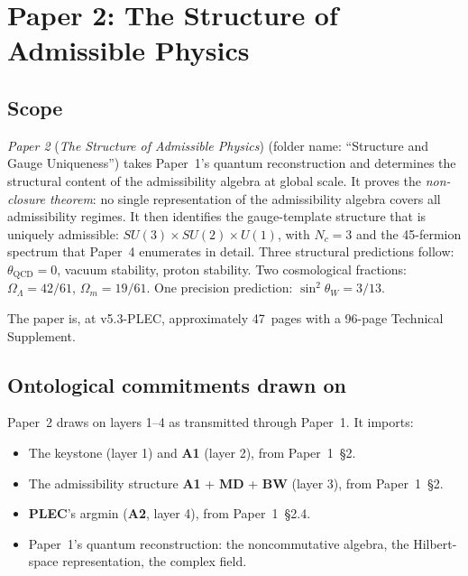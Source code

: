 \documentclass[11pt]{article}
\newcommand{\paperref}[2]{\emph{Paper #1} (\emph{#2})}
\newcommand{\Aone}{\textbf{A1}}
\newcommand{\PLEC}{\textbf{PLEC}}
\begin{document}
\section{Paper 2: The Structure of Admissible Physics}\label{sec:P2}

\subsection{Scope}\label{sec:P2_scope}

\paperref{2}{The Structure of Admissible Physics} (folder name: ``Structure and Gauge Uniqueness'') takes Paper~1's quantum reconstruction and determines the structural content of the admissibility algebra at global scale. It proves the \emph{non-closure theorem}: no single representation of the admissibility algebra covers all admissibility regimes. It then identifies the gauge-template structure that is uniquely admissible: $SU(3) \times SU(2) \times U(1)$, with $N_c = 3$ and the 45-fermion spectrum that Paper~4 enumerates in detail. Three structural predictions follow: $\theta_{\mathrm{QCD}} = 0$, vacuum stability, proton stability. Two cosmological fractions: $\Omega_\Lambda = 42/61$, $\Omega_m = 19/61$. One precision prediction: $\sin^2\theta_W = 3/13$.

The paper is, at v5.3-PLEC, approximately 47~pages with a 96-page Technical Supplement.

\subsection{Ontological commitments drawn on}\label{sec:P2_commitments}

Paper~2 draws on layers 1--4 as transmitted through Paper~1. It imports:

\begin{itemize}
    \item The keystone (layer 1) and \Aone{} (layer 2), from Paper~1~\S2.
    \item The admissibility structure \Aone{} + \textbf{MD} + \textbf{BW} (layer 3), from Paper~1~\S2.
    \item \PLEC{}'s argmin (\textbf{A2}, layer 4), from Paper~1~\S2.4.
    \item Paper~1's quantum reconstruction: the noncommutative algebra, the Hilbert-space representation, the complex field.
\end{itemize}
\end{document}

